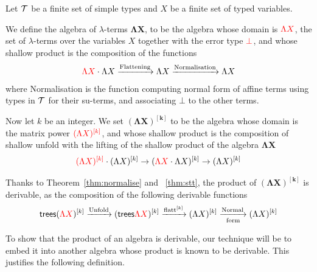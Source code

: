 \begin{example} Let $\Tt$ be a finite set of simple types and $X$ be a finite set of typed variables. 

We define the algebra of $\lambda$-terms $\mathbf{\Lambda X}$, to be the algebra whose domain is $\ranked{\Lambda X}$, the set of $\lambda$-terms over the variables $X$ together with the error type $\ranked{\bot}$, and whose shallow product is the composition of the functions
\begin{align*}
\ranked{\Lambda X}\cdot \Lambda X \xrightarrow{\text{Flattening}} \Lambda X \xrightarrow{\text{Normalisation}} \Lambda X 
\end{align*}
where Normalisation is the function computing normal form of affine terms using types in $\Tt$ for their su-terms, and associating $\bot$ to the other terms. 



Now let $k$ be an integer. We set $\mathbf{(\Lambda X)^{[k]}}$ to be the algebra whose domain is the matrix power $\ranked{\mati k {(\Lambda X)}}$, and whose shallow product is the composition of shallow unfold with the lifting of the shallow product of the algebra $\mathbf{\Lambda X}$
\begin{align*}
\ranked{(\Lambda X)^{[k]}}\cdot (\Lambda X)^{[k]} \to (\ranked{\Lambda X}\cdot \Lambda X)^{[k]}  \to (\Lambda X)^{[k]} 
\end{align*}

Thanks to Theorem~\ref{thm:normalise} and ~\ref{thm:stt}, the product of $\mathbf{(\Lambda X)^{[k]}}$ is derivable, as the composition of the following derivable functions
\begin{align*}
\trees(\ranked{\Lambda X})^{[k]} \xrightarrow{\text{Unfold}} (\trees \ranked{\Lambda X})^{[k]} \xrightarrow{\text{flatt}^{[k]}} 
 (\Lambda X)^{[k]} \underset{\text{form}}{\xrightarrow{\text{Normal}}}  (\Lambda X)^{[k]}
\end{align*}
\end{example}

To show that the product of an algebra is derivable, our technique will be to embed it into another algebra whose 
product is known to be derivable. This justifies the following definition.

